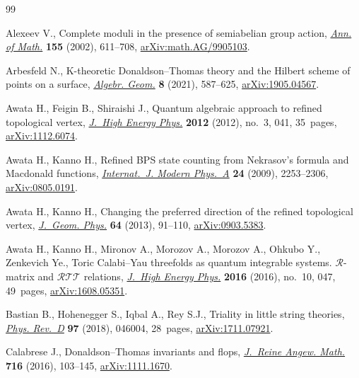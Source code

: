\documentclass[pdftex]{sigma}%
\numberwithin{equation}{section}
\begin{document}
\begin{thebibliography}{99}
\footnotesize\itemsep=0pt

Alexeev V., Complete moduli in the presence of semiabelian group action,
 \href{https://doi.org/10.2307/3062130}{\textit{Ann. of Math.}} \textbf{155} (2002), 611--708,
 \href{https://arxiv.org/abs/math.AG/9905103}{arXiv:math.AG/9905103}.

Arbesfeld N., K-theoretic {D}onaldson--{T}homas theory and the {H}ilbert scheme
 of points on a surface, \href{https://doi.org/10.14231/ag-2021-018}{\textit{Algebr. Geom.}} \textbf{8} (2021), 587--625,
 \href{https://arxiv.org/abs/1905.04567}{arXiv:1905.04567}.

Awata H., Feigin B., Shiraishi J., Quantum algebraic approach to refined
 topological vertex, \href{https://doi.org/10.1007/JHEP03(2012)041}{\textit{J.~High Energy Phys.}} \textbf{2012} (2012),
 no.~3, 041, 35~pages, \href{https://arxiv.org/abs/1112.6074}{arXiv:1112.6074}.

Awata H., Kanno H., Refined {BPS} state counting from {N}ekrasov's formula and
 {M}acdonald functions, \href{https://doi.org/10.1142/S0217751X09043006}{\textit{Internat.~J. Modern Phys.~A}} \textbf{24}
 (2009), 2253--2306, \href{https://arxiv.org/abs/0805.0191}{arXiv:0805.0191}.

Awata H., Kanno H., Changing the preferred direction of the refined topological
 vertex, \href{https://doi.org/10.1016/j.geomphys.2012.10.014}{\textit{J.~Geom. Phys.}} \textbf{64} (2013), 91--110,
 \href{https://arxiv.org/abs/0903.5383}{arXiv:0903.5383}.

Awata H., Kanno H., Mironov A., Morozov A., Morozov A., Ohkubo Y., Zenkevich
 {\relax Ye}., Toric {C}alabi--{Y}au threefolds as quantum integrable systems.
 {$\mathcal R$}-matrix and {$\mathcal{RTT}$} relations, \href{https://doi.org/10.1007/JHEP10(2016)047}{\textit{J.~High Energy
 Phys.}} \textbf{2016} (2016), no.~10, 047, 49~pages, \href{https://arxiv.org/abs/1608.05351}{arXiv:1608.05351}.

Bastian B., Hohenegger S., Iqbal A., Rey S.J., Triality in little string
 theories, \href{https://doi.org/10.1103/physrevd.97.046004}{\textit{Phys. Rev.~D}} \textbf{97} (2018), 046004, 28~pages,
 \href{https://arxiv.org/abs/1711.07921}{arXiv:1711.07921}.

Calabrese J., Donaldson--{T}homas invariants and flops, \href{https://doi.org/10.1515/crelle-2014-0017}{\textit{J.~Reine Angew.
 Math.}} \textbf{716} (2016), 103--145, \href{https://arxiv.org/abs/1111.1670}{arXiv:1111.1670}.


\end{thebibliography}
\end{document}
